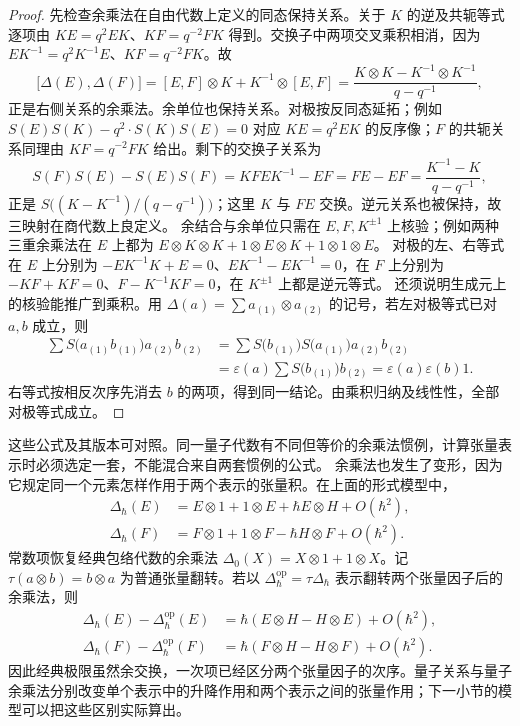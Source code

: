 \begin{proof}
	先检查余乘法在自由代数上定义的同态保持关系。关于 \(K\) 的逆及共轭等式逐项由 \(KE=q^2EK\)、\(KF=q^{-2}FK\) 得到。交换子中两项交叉乘积相消，因为 \(EK^{-1}=q^2K^{-1}E\)、\(KF=q^{-2}FK\)。故
	\[
		\bigl[\Delta(E),\Delta(F)\bigr] =[E,F]\otimes K+K^{-1}\otimes[E,F] =\frac{K\otimes K-K^{-1}\otimes K^{-1}}{q-q^{-1}},
	\]
	正是右侧关系的余乘法。余单位也保持关系。对极按反同态延拓；例如 \(S(E)S(K)-q^2\cdot S(K)S(E)=0\) 对应 \(KE=q^2EK\) 的反序像；\(F\) 的共轭关系同理由 \(KF=q^{-2}FK\) 给出。剩下的交换子关系为
	\[
		S(F)S(E)-S(E)S(F) =KFEK^{-1}-EF =FE-EF =\frac{K^{-1}-K}{q-q^{-1}},
	\]
	正是 \(S\bigl((K-K^{-1})/(q-q^{-1})\bigr)\)；这里 \(K\) 与 \(FE\) 交换。逆元关系也被保持，故三映射在商代数上良定义。 余结合与余单位只需在 \(E,F,K^{\pm1}\) 上核验；例如两种三重余乘法在 \(E\) 上都为 \(E\otimes K\otimes K+1\otimes E\otimes K+1\otimes1\otimes E\)。 对极的左、右等式在 \(E\) 上分别为 \(-EK^{-1}K+E=0\)、\(EK^{-1}-EK^{-1}=0\)，在 \(F\) 上分别为 \(-KF+KF=0\)、\(F-K^{-1}KF=0\)，在 \(K^{\pm1}\) 上都是逆元等式。 还须说明生成元上的核验能推广到乘积。用 \(\Delta(a)=\sum a_{(1)}\otimes a_{(2)}\) 的记号，若左对极等式已对 \(a,b\) 成立，则
	\[
		\begin{aligned}
			\sum S\bigl(a_{(1)}b_{(1)}\bigr)a_{(2)}b_{(2)} &=\sum S\bigl(b_{(1)}\bigr)S\bigl(a_{(1)}\bigr)a_{(2)}b_{(2)}\\
			&=\varepsilon(a)\sum S\bigl(b_{(1)}\bigr)b_{(2)} =\varepsilon(a)\varepsilon(b)1.
		\end{aligned}
	\]
	右等式按相反次序先消去 \(b\) 的两项，得到同一结论。由乘积归纳及线性性，全部对极等式成立。
\end{proof}
这些公式及其版本可对照\cite[Definition 5.6.1; Theorem 5.6.2]{EtingofEtAl2015TensorCategories}。同一量子代数有不同但等价的余乘法惯例，计算张量表示时必须选定一套，不能混合来自两套惯例的公式。
\ProseParagraphBreak
余乘法也发生了变形，因为它规定同一个元素怎样作用于两个表示的张量积。在上面的形式模型中，
\[
	\begin{aligned}
		\Delta_\hbar(E)&=E\otimes1+1\otimes E+\hbar E\otimes H+O(\hbar^2),\\
		\Delta_\hbar(F)&=F\otimes1+1\otimes F-\hbar H\otimes F+O(\hbar^2).
	\end{aligned}
\]
常数项恢复经典包络代数的余乘法 \(\Delta_0(X)=X\otimes1+1\otimes X\)。记 \(\tau(a\otimes b)=b\otimes a\) 为普通张量翻转。若以 \(\Delta_\hbar^{\mathrm{op}}=\tau\Delta_\hbar\) 表示翻转两个张量因子后的余乘法，则
\[
	\begin{aligned}
		\Delta_\hbar(E)-\Delta_\hbar^{\mathrm{op}}(E) &=\hbar(E\otimes H-H\otimes E)+O(\hbar^2),\\
		\Delta_\hbar(F)-\Delta_\hbar^{\mathrm{op}}(F) &=\hbar(F\otimes H-H\otimes F)+O(\hbar^2).
	\end{aligned}
\]
因此经典极限虽然余交换，一次项已经区分两个张量因子的次序。量子关系与量子余乘法分别改变单个表示中的升降作用和两个表示之间的张量作用；下一小节的模型可以把这些区别实际算出。

